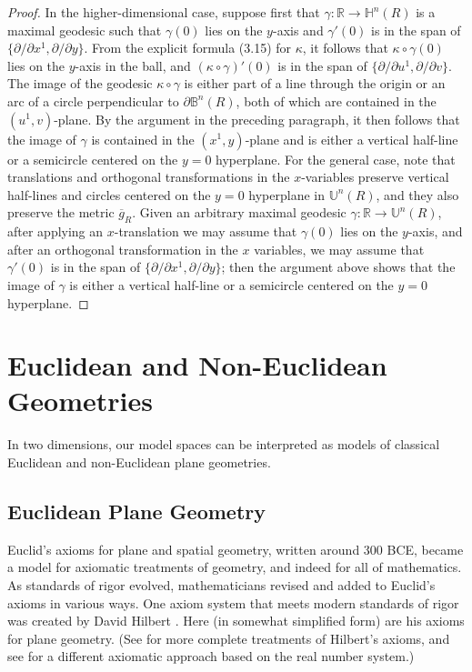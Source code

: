 \begin{theorem}
\begin{proof}
In the higher-dimensional case, suppose first that $\gamma : \mathbb{R} \to \mathbb{H}^n(R)$ is a maximal geodesic such that $\gamma(0)$ lies on the $y$-axis and $\gamma'(0)$ is in the span of $\{\partial/\partial x^1,\partial/\partial y\}$. From the explicit formula (3.15) for $\kappa$, it follows that $\kappa \circ \gamma(0)$ lies on the $y$-axis in the ball, and $(\kappa \circ \gamma)'(0)$ is in the span of $\{\partial/\partial u^1,\partial/\partial v\}$. The image of the geodesic $\kappa \circ \gamma$ is either part of a line through the origin or an arc of a circle perpendicular to $\partial\mathbb{B}^n(R)$, both of which are contained in the $(u^1,v)$-plane. By the argument in the preceding paragraph, it then follows that the image of $\gamma$ is contained in the $(x^1, y)$-plane and is either a vertical half-line or a semicircle centered on the $y = 0$ hyperplane. For the general case, note that translations and orthogonal transformations in the $x$-variables preserve vertical half-lines and circles centered on the $y = 0$ hyperplane in $\mathbb{U}^n(R)$, and they also preserve the metric $\overline{g}_R$. Given an arbitrary maximal geodesic $\gamma : \mathbb{R} \to \mathbb{U}^n(R)$, after applying an $x$-translation we may assume that $\gamma(0)$ lies on the $y$-axis, and after an orthogonal transformation in the $x$ variables, we may assume that $\gamma'(0)$ is in the span of $\{\partial/\partial x^1, \partial/\partial y\}$; then the argument above shows that the image of $\gamma$ is either a vertical half-line or a semicircle centered on the $y = 0$ hyperplane.
\end{proof}
\end{theorem}

\section{Euclidean and Non-Euclidean Geometries}

In two dimensions, our model spaces can be interpreted as models of classical Euclidean and non-Euclidean plane geometries.

\subsection*{Euclidean Plane Geometry}

Euclid's axioms for plane and spatial geometry, written around 300 BCE, became a model for axiomatic treatments of geometry, and indeed for all of mathematics. As standards of rigor evolved, mathematicians revised and added to Euclid's axioms in various ways. One axiom system that meets modern standards of rigor was created by David Hilbert \cite{Hil71}. Here (in somewhat simplified form) are his axioms for plane geometry. (See \cite[Gan73,Gre93]{Hil71} for more complete treatments of Hilbert's axioms, and see \cite{LeeAG} for a different axiomatic approach based on the real number system.)

